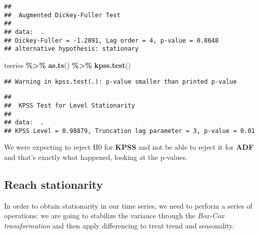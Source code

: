 \documentclass[
]{article}
\newenvironment{Shaded}{\begin{snugshade}}{\end{snugshade}}
\newcommand{\AttributeTok}[1]{\textcolor[rgb]{0.13,0.29,0.53}{#1}}
\newcommand{\FunctionTok}[1]{\textcolor[rgb]{0.13,0.29,0.53}{\textbf{#1}}}
\newcommand{\NormalTok}[1]{#1}
\newcommand{\OtherTok}[1]{\textcolor[rgb]{0.56,0.35,0.01}{#1}}
\newcommand{\SpecialCharTok}[1]{\textcolor[rgb]{0.81,0.36,0.00}{\textbf{#1}}}
\begin{document}
\begin{verbatim}
## 
##  Augmented Dickey-Fuller Test
## 
## data:  .
## Dickey-Fuller = -1.2891, Lag order = 4, p-value = 0.8648
## alternative hypothesis: stationary
\end{verbatim}

\begin{Shaded}
\begin{Highlighting}[]
\NormalTok{tseries }\SpecialCharTok{\%\textgreater{}\%} \FunctionTok{as.ts}\NormalTok{() }\SpecialCharTok{\%\textgreater{}\%} \FunctionTok{kpss.test}\NormalTok{()}
\end{Highlighting}
\end{Shaded}

\begin{verbatim}
## Warning in kpss.test(.): p-value smaller than printed p-value
\end{verbatim}

\begin{verbatim}
## 
##  KPSS Test for Level Stationarity
## 
## data:  .
## KPSS Level = 0.98879, Truncation lag parameter = 3, p-value = 0.01
\end{verbatim}

We were expecting to reject H0 for \textbf{KPSS} and not be able to
reject it for \textbf{ADF} and that's exactly what happened, looking at
the p-values.

\hypertarget{reach-stationarity}{%
\subsection{Reach stationarity}\label{reach-stationarity}}

In order to obtain stationarity in our time series, we need to perform a
series of operations: we are going to stabilize the variance through the
\emph{Box-Cox transformation} and then apply differencing to treat trend
and seasonality.

\begin{Shaded}
\end{Shaded}
\end{document}
